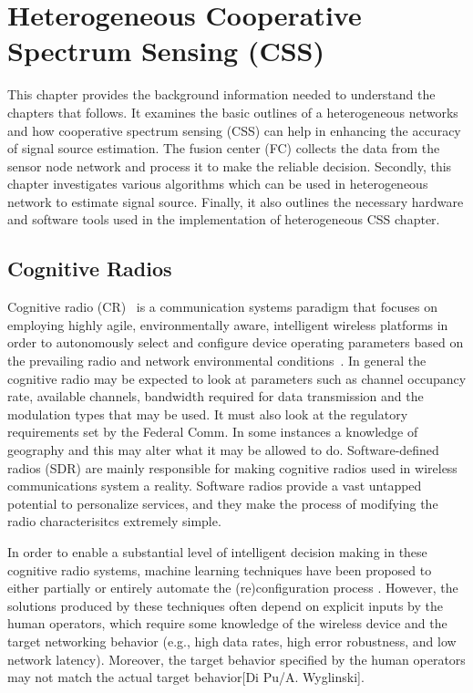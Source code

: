 \chapter{Heterogeneous Cooperative Spectrum Sensing (CSS)}
\label{chapter2}

This chapter provides the background information needed to understand the chapters that follows. It examines the basic outlines of a heterogeneous networks and how cooperative spectrum sensing (CSS) can help in enhancing the accuracy of signal source estimation. The fusion center (FC) collects the data from the sensor node network and process it to make the reliable decision. Secondly, this chapter investigates various algorithms which can be used in heterogeneous network to estimate signal source. Finally, it also outlines the necessary hardware and software tools used in the implementation of heterogeneous CSS chapter.

\section{Cognitive Radios}
Cognitive radio (CR)~\cite{cogjm} is a communication systems paradigm that focuses on employing highly agile, environmentally aware, intelligent wireless platforms in
order to autonomously select and configure device operating parameters based on the prevailing radio and network environmental conditions~\cite{bookhtn1}. In general the cognitive radio may be expected to look at parameters such as channel occupancy rate, available channels, bandwidth required for data transmission and the modulation types that may be used. It must also look at the regulatory requirements set by the Federal Comm. In some instances a knowledge of geography and this may alter what it may be allowed to do. Software-defined radios (SDR) are mainly responsible for making cognitive radios used in wireless communications system a reality. Software radios provide a vast untapped potential to personalize services, and they make the process of modifying the radio characterisitcs extremely simple. 











In order to enable a substantial level of intelligent decision making in these cognitive radio systems, machine learning techniques have been proposed to either partially or entirely automate the (re)configuration process . However, the solutions produced by these techniques often depend on explicit inputs by the human operators, which require some knowledge of the wireless device and the target networking behavior (e.g., high data rates, high error robustness, and low network latency). Moreover, the target behavior specified by the human operators may not match the actual target behavior[Di Pu/A. Wyglinski].

















